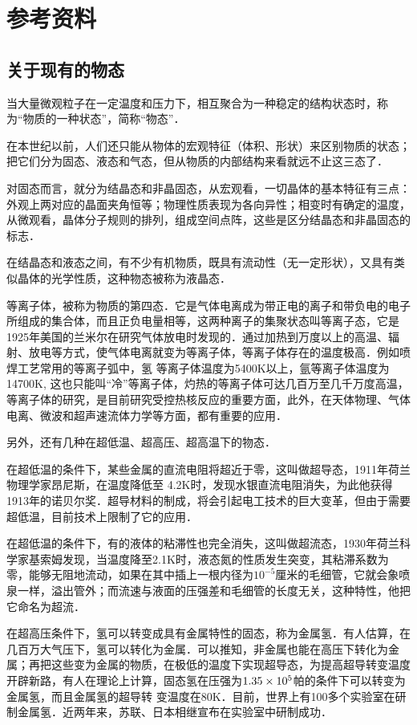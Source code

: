 \section{参考资料}
\subsection{关于现有的物态}

当大量微观粒子在一定温度和压力下，相互聚合为一种稳定的结构状态时，称为“物质的一种状态”，简称“物态”．

在本世纪以前，人们还只能从物体的宏观特征（体积、形状）来区别物质的状态；把它们分为固态、液态和气态，但从物质的内部结构来看就远不止这三态了．

对固态而言，就分为结晶态和非晶固态，从宏观看，一切晶体的基本特征有三点：外观上两对应的晶面夹角恒等；物理性质表现为各向异性；相变时有确定的温度，从微观看，晶体分子规则的排列，组成空间点阵，这些是区分结晶态和非晶固态的标志．

在结晶态和液态之间，有不少有机物质，既具有流动性（无一定形状），又具有类似晶体的光学性质，这种物态被称为液晶态．

等离子体，被称为物质的第四态．它是气体电离成为带正电的离子和带负电的电子所组成的集合体，而且正负电量相等，这两种离子的集聚状态叫等离子态，它是1925年美国的兰米尔在研究气体放电时发现的．通过加热到万度以上的高温、辐射、放电等方式，使气体电离就变为等离子体，等离子体存在的温度极高．例如喷焊工艺常用的等离子弧中，氢
等离子体温度为5400K以上，氩等离子体温度为14700K, 这也只能叫“冷”等离子体，灼热的等离子体可达几百万至几千万度高温，等离子体的研究，是目前研究受控热核反应的重要方面，此外，在天体物理、气体电离、微波和超声速流体力学等方面，都有重要的应用．

另外，还有几种在超低温、超高压、超高温下的物态．

在超低温的条件下，某些金属的直流电阻将超近于零，这叫做超导态，1911年荷兰物理学家昂尼斯，在温度降低至
4.2K时，发现水银直流电阻消失，为此他获得1913年的诺贝尔奖．超导材料的制成，将会引起电工技术的巨大变革，但由于需要超低温，目前技术上限制了它的应用．

在超低温的条件下，有的液体的粘滞性也完全消失，这叫做超流态，1930年荷兰科学家基索姆发现，当温度降至2.1K时，液态氮的性质发生突变，其粘滞系数为零，能够无阻地流动，如果在其中插上一根内径为$10^{-5}$厘米的毛细管，它就会象喷泉一样，溢出管外；而流速与液面的压强差和毛细管的长度无关，这种特性，他把它命名为超流．

在超高压条件下，氢可以转变成具有金属特性的固态，称为金属氢．有人估算，在几百万大气压下，氢可以转化为金属．可以推知，非金属也能在高压下转化为金属；再把这些变为金属的物质，在极低的温度下实现超导态，为提高超导转变温度开辟新路，有人在理论上计算，固态氢在压强为$1. 35\times10^5$帕的条件下可以转变为金属氢，而且金属氢的超导转
变温度在80K．目前，世界上有100多个实验室在研制金属氢．近两年来，苏联、日本相继宣布在实验室中研制成功．

